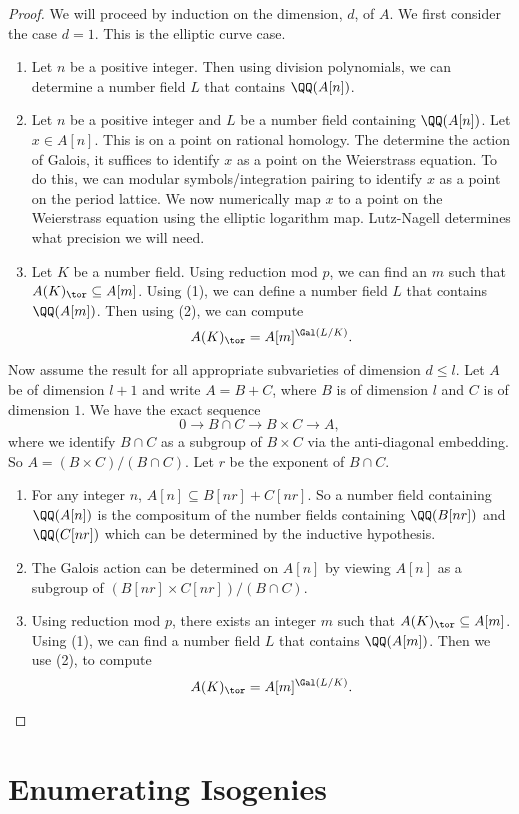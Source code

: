 \documentclass{article}
\begin{document}
\begin{proof}
    We will proceed by induction on the dimension, $d$, of $A$. We first
    consider the case $d=1$. This is the elliptic curve case.
    \begin{enumerate}
        \item 
            Let $n$ be a positive integer. Then using division polynomials, we
            can determine a number field $L$ that contains $\QQ(A[n])$.
        \item
            Let $n$ be a positive integer and $L$ be a number field containing
            $\QQ(A[n])$. Let $x\in A[n]$. This is on a point on rational
            homology. The determine the action of Galois, it suffices to
            identify $x$ as a point on the Weierstrass equation. To do this, we
            can modular symbols/integration pairing to identify $x$ as a point
            on the period lattice. We now numerically map $x$ to a point on the
            Weierstrass equation using the elliptic logarithm map. Lutz-Nagell
            determines what precision we will need.
        \item
            Let $K$ be a number field. Using reduction mod $p$, we can find an
            $m$ such that $A(K)_\tor \subseteq A[m]$. Using (1), we can define
            a number field $L$ that contains $\QQ(A[m])$. Then using (2), we
            can compute
            \[
                A(K)_\tor = A[m]^{\Gal(L/K)}.
            \]
    \end{enumerate}

    Now assume the result for all appropriate subvarieties of dimension $d\leq
    l$. Let $A$ be of dimension $l+1$ and write $A=B+C$, where $B$ is of
    dimension $l$ and $C$ is of dimension $1$.  We have the exact sequence
    \[
        0\to B\cap C \to B\times C \to A,
    \]
    where we identify $B\cap C$ as a subgroup of $B\times C$ via the
    anti-diagonal embedding. So $A=(B\times C)/(B\cap C)$. Let $r$ be the
    exponent of $B\cap C$. 
    \begin{enumerate}
        \item 
            For any integer $n$, $A[n] \subseteq B[nr]+C[nr]$. So a number
            field containing $\QQ(A[n])$ is the compositum  of the number
            fields containing $\QQ(B[nr])$ and $\QQ(C[nr])$ which can be
            determined by the inductive hypothesis.
        \item
            The Galois action can be determined on $A[n]$ by viewing $A[n]$ as
            a subgroup of $(B[nr]\times C[nr])/(B\cap C)$.
        \item
            Using reduction mod $p$, there exists an integer $m$ such that
            $A(K)_\tor\subseteq A[m]$. Using (1), we can find a number field
            $L$ that contains $\QQ(A[m])$. Then we use (2), to compute
            \[
                A(K)_\tor = A[m]^{\Gal(L/K)}.
            \]
    \end{enumerate}
\end{proof}


\section{Enumerating Isogenies}%
\label{sec:enum_isogenies}



\end{document}
